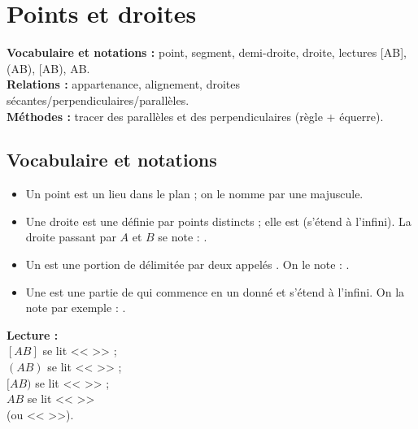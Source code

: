 \chapter{Points et droites}
\label{chap:seq02}

\newcommand{\trou}[1]{\makebox[#1]{\dotfill}}

\begin{objectifsbox}
	\textbf{Vocabulaire et notations :} point, segment, demi-droite, droite, lectures [AB], (AB), [AB), AB.\\
	\textbf{Relations :} appartenance, alignement, droites sécantes/perpendiculaires/parallèles.\\
	\textbf{Méthodes :} tracer des parallèles et des perpendiculaires (règle + équerre).
\end{objectifsbox}

\section{ Vocabulaire et notations}
\begin{itemize}
	\item Un point est un lieu dans le plan ; on le nomme par une \trou{5cm} majuscule.
	\item Une droite est une \trou{3cm} définie par \trou{3cm} points distincts ; elle est \trou{3cm} (s'étend à l'infini).
	La droite passant par $A$ et $B$ se note : \trou{5cm}.
	\item Un \trou{3cm} est une portion de \trou{3cm} délimitée par deux \trou{3cm} appelés \trou{3cm}.
	On le note : \trou{3cm}.
	\item Une \trou{3cm} est une partie de \trou{2.2cm} qui commence en un \trou{3cm} donné et s'étend à l'infini.
	On la note par exemple : \trou{3cm}.
\end{itemize}

\textbf{Lecture :} \\
$[AB]$ se lit << \trou{14cm} >> ;\\
$(AB)$ se lit << \trou{14cm} >> ;\\
$[AB)$ se lit << \trou{14cm} >> ;\\
$AB$ se lit << \trou{14cm} >>\\
(ou << \trou{14cm} >>).

